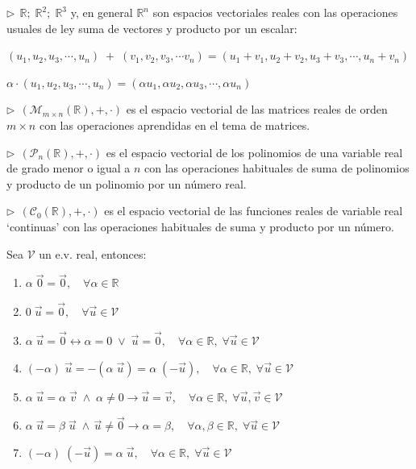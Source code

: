\vspace{3mm}
\begin{cuadro-gris}
$\triangleright\ \  \mathbb R; \; \mathbb R^2; \; \mathbb R^3$ y, en general $\mathbb R^n$  son espacios vectoriales reales con las operaciones usuales de ley suma de vectores y producto por un escalar:

$(u_1,u_2,u_3, \cdots, u_n)\; +\; (v_1,v_2,v_3, \cdots v_n)=(u_1+v_1, u_2+v_2, u_3+v_3, \cdots , u_n+v_n)$

 $\alpha \cdot (u_1,u_2,u_3, \cdots, u_n) =(\alpha u_1,\alpha u_2,\alpha u_3, \cdots, \alpha u_n)$

$\triangleright\ \ (\mathcal M_{m \times n}(\mathbb R),+,\cdot)$ es el espacio vectorial de las matrices reales de orden $m \times n$ con las operaciones aprendidas en el tema de matrices.

$\triangleright\ \ (\mathcal P_n(\mathbb R), +, \cdot)$ es el espacio vectorial de los polinomios de una variable real de grado menor o igual a $n$ con las operaciones habituales de suma de polinomios y producto de un polinomio por un número real.

$\triangleright\ \ (\mathcal C_0(\mathbb R), +, \cdot)$ es el espacio vectorial de las funciones reales de variable real `continuas' con las operaciones habituales de suma y producto por un número.

\end{cuadro-gris}

\vspace{3mm}
\begin{theorem} 

Sea $\mathcal V$ un e.v. real, entonces:
\begin{enumerate}[P1. ]
\item $\alpha \; \vec 0=\vec 0,\quad \forall \alpha \in \mathbb R$
\item $0 \; \vec u= \vec 0, \quad \forall \vec u \in \mathcal V$
\item $\alpha \; \vec u = \vec 0 \leftrightarrow \alpha = 0 \; \vee \; \vec u= \vec 0, \quad \forall \alpha \in \mathbb R,\; \forall \vec u \in \mathcal V$
\item $(-\alpha)\; \vec u=-(\alpha \; \vec u)=\alpha\;  (-\vec u),  \quad \forall \alpha \in \mathbb R,\; \forall \vec u \in \mathcal V$
\item $\alpha \; \vec u = \alpha\; \vec v \; \wedge \; \alpha \neq 0 \to \vec u = \vec v, \quad \forall \alpha \in \mathbb R,\; \forall \vec u, \vec v \in \mathcal V$
\item $\alpha \; \vec u = \beta \; \vec u \; \wedge \, \vec u \neq \vec 0 \to \alpha = \beta, \quad \forall \alpha, \beta \in \mathbb R,\; \forall \vec u \in \mathcal V$
\item $(-\alpha)\; (-\vec u)= \alpha \; \vec u , \quad \forall \alpha \in \mathbb R,\; \forall \vec u \in \mathcal V$
	
\end{enumerate}	
\end{theorem}


